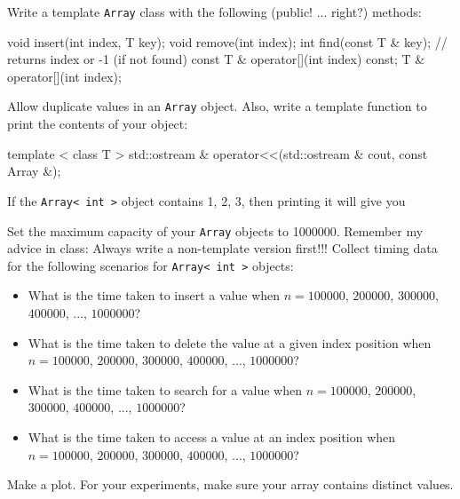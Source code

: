 Write a template \verb!Array! class with the following 
(public! ... right?) methods:
\begin{console}[fontsize=\footnotesize]
void      insert(int index, T key);
void      remove(int index);
int       find(const T & key); // returns index or -1 (if not found)
const T & operator[](int index) const;
T &  operator[](int index);
\end{console}
Allow duplicate values in an \verb!Array! object.
Also, write a template function to print the contents of your object:
\begin{console}[fontsize=\footnotesize]
template < class T >
std::ostream & operator<<(std::ostream & cout,  const Array &);
\end{console}
If the \verb!Array< int >! object contains 1, 2, 3, then printing it will
give you
\begin{console}[fontsize=\footnotesize]
[1, 2, 3]
\end{console}
Set the maximum capacity of your \verb!Array! objects to 1000000.
Remember my advice in class:
Always write a non-template version first!!!
Collect timing data for the following scenarios for 
\verb!Array< int >! objects:
\begin{itemize}
\item What is the time taken to insert a value when
$n = 100000$, $200000$, $300000$, $400000$, ..., $1000000$?
\item What is the time taken to delete the value at a given index position
when
$n = 100000$, $200000$, $300000$, $400000$, ..., $1000000$?
\item What is the time taken to search for a value when
$n = 100000$, $200000$, $300000$, $400000$, ..., $1000000$?
\item What is the time taken to access a value at an index position when
$n = 100000$, $200000$, $300000$, $400000$, ..., $1000000$?
\end{itemize}
Make a plot.
For your experiments, make sure your array contains distinct
values.

